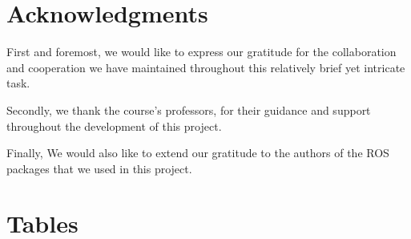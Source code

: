 \documentclass[conference]{IEEEtran}
\begin{document}
\section{Acknowledgments}

First and foremost, we would like to express our gratitude for the collaboration and cooperation we have maintained throughout this relatively brief yet intricate task.

Secondly, we thank the course's professors, for their guidance and support throughout the development
of this project.

Finally, We would also like to extend our gratitude to the authors of the ROS packages that we used in this project.


\appendices

\section{Tables} \label{tables}
\end{document}
